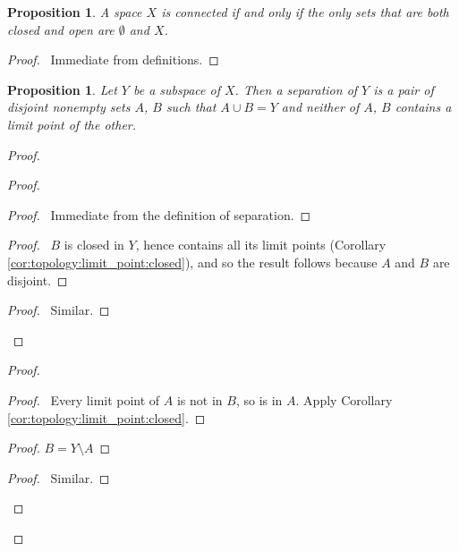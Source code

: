 \documentclass{report}
\let\qed\relax
\newtheorem{prop}[lm]{Proposition}
\theoremstyle{definition}
\begin{document}
  \begin{prop}
    A space $X$ is connected if and only if the only sets that are both closed
    and open are $\emptyset$ and $X$.
  \end{prop}

  \begin{proof}
    \pf\ Immediate from definitions. \qed
  \end{proof}

  \begin{prop}
    Let $Y$ be a subspace of $X$. Then a separation of $Y$ is a pair of
    disjoint
    nonempty sets $A$, $B$ such that $A \cup B = Y$ and neither of $A$, $B$
    contains a limit point of the other.
  \end{prop}

  \begin{proof}
    \pf
    \begin{proof}
      \begin{proof}
        \pf\ Immediate from the definition of separation.
      \end{proof}
      \begin{proof}
        \pf\ $B$ is closed in $Y$, hence contains all its limit points
        (Corollary \ref{cor:topology:limit_point:closed}), and so the result
        follows because $A$ and $B$ are disjoint.
      \end{proof}
      \begin{proof}
        \pf\ Similar.
      \end{proof}
    \end{proof}
    \begin{proof}
      \begin{proof}
        \pf\ Every limit point of $A$ is not in $B$, so is in $A$. Apply
        Corollary \ref{cor:topology:limit_point:closed}.
      \end{proof}
      \begin{proof}
        \pf $B = Y \setminus A$
      \end{proof}
      \begin{proof}
        \pf\ Similar.
      \end{proof}
    \end{proof}
    \qed
  \end{proof}
\end{document}
